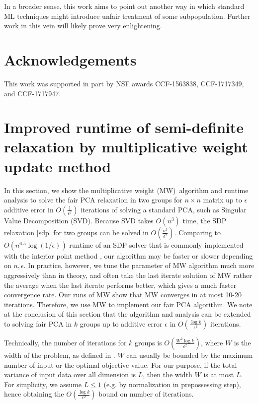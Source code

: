 \documentclass{article}
\begin{document}
In a broader sense, this work aims to point out another way in which
standard ML techniques might introduce unfair treatment of some
subpopulation. Further work in this vein will likely prove very
enlightening.

\newpage
\section*{Acknowledgements} 
This work was supported in part by NSF awards CCF-1563838, CCF-1717349, and CCF-1717947.


{}



\newpage
\appendix

\section{Improved runtime of semi-definite relaxation by multiplicative weight update method} \label{sec:mw}

In this section, we show the multiplicative weight (MW)\ algorithm and
runtime analysis to solve the fair PCA relaxation in two groups for
\(n\times n\)  matrix up to \(\epsilon\) additive error in \(O(\frac{1}{\epsilon^2})\) iterations of solving a standard PCA, such as Singular Value Decomposition (SVD). Because SVD takes  \(O(n^3)\) time, the SDP relaxation \eqref{sdp} for two groups can be solved in \(O(\frac{n^3}{\epsilon^2})\). Comparing to \(O(n^{6.5}\log(1/\epsilon))\)  runtime of an SDP solver
that is commonly implemented with the interior point method
\citep{ben2001lectures}, our algorithm may be faster or slower depending on \(n,\epsilon\).
In practice, however, we tune the parameter of MW algorithm much more aggressively than in theory, and often take the last iterate solution of MW rather the average when the last iterate performs better, which gives a much faster convergence rate. Our runs of MW show that MW converges in at most 10-20 iterations. Therefore, we use MW to implement our fair PCA algorithm.
We note at the conclusion of this section that the algorithm and analysis can be extended to solving fair PCA in \(k\) groups up to additive error \(\epsilon\) in \(O(\frac{\log k}{\epsilon^2})\) iterations. 

Technically, the number of iterations for \(k\) groups is
\(O(\frac{W^2\log k}{\epsilon^2})\), where \(W\) is  the width
of the problem, as defined in \citet{arora2012multiplicative}. \(W\) can usually be bounded by the maximum number of
input or the optimal objective value. For our purpose, if the total variance  of input data over all dimension is \(L\), then the width \(W\) is at most \(L\). For simplicity, we assume \(L\leq 1\) (e.g. by normalization in prepossessing step), hence obtaining the \(O(\frac{\log k}{\epsilon^2})\)  bound on number of iterations. 
\end{document}
